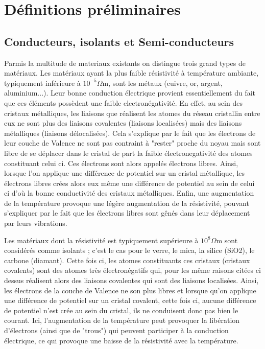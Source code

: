 \documentclass[10pt,a4paper]{report}
\begin{document}
\chapter{Définitions préliminaires}
\section{Conducteurs, isolants et Semi-conducteurs}
Parmis la multitude de materiaux existants  on distingue trois grand types de matériaux.
Les  matériaux  ayant  la  plus  faible  résistivité  à  température  ambiante,  typiquement inférieure  à  $10^{-5} \Omega$m,  sont  les  métaux  (cuivre,  or,  argent,  aluminium...). Leur bonne  conduction électrique provient essentiellement du fait que ces éléments possèdent une faible electronégativité. En effet, au sein des cristaux métalliques, les liaisons que réalisent les atomes du réseau cristallin entre eux ne sont plus des liaisons covalentes (liaisons localisées) mais des liaisons métalliques (liaisons délocalisées). Cela s'explique par le fait que les électrons de leur couche de Valence ne sont pas contraint à "rester" proche du noyau mais sont libre de se déplacer dans le cristal de part la faible électronegativité des atomes constituant celui ci. Ces électrons sont alors appelés électrons libres. Ainsi, lorsque l'on applique une différence de potentiel sur un cristal métallique, les électrons libres crées alors eux même une différence de potentiel au sein de celui ci d'où la bonne conductivité des cristaux métalliques. Enfin, une augmentation de  la
température provoque une légère augmentation de la résistivité, pouvant s’expliquer par le fait que les électrons libres sont gênés dans leur déplacement par leurs vibrations.

 Les  matériaux  dont  la  résistivité  est  typiquement  supérieure  à  $10^8 \Omega$m  sont  considérés comme isolants ; c’est le cas pour le verre, le mica, la silice (SiO2), le carbone (diamant). Cette fois ci, les atomes constituants ces cristaux (cristaux covalents) sont des atomes très électronégatifs qui, pour les même raisons citées ci dessus réalisent alors  des liaisons covalentes qui sont des liaisons localisées. Ainsi, les électrons de la couche de Valence ne son plus libres et lorsque qu'on applique une différence de potentiel sur un cristal covalent, cette fois ci, aucune différence de potentiel n'est crée au sein du cristal, ils ne conduisent donc pas bien le courant. Ici, l’augmentation  de  la  température  peut  provoquer  la  libération  d’électrons  (ainsi  que  de "trous")  qui  peuvent  participer  à  la  conduction  électrique,  ce  qui  provoque  une  baisse  de  la résistivité avec la température.
\end{document}
